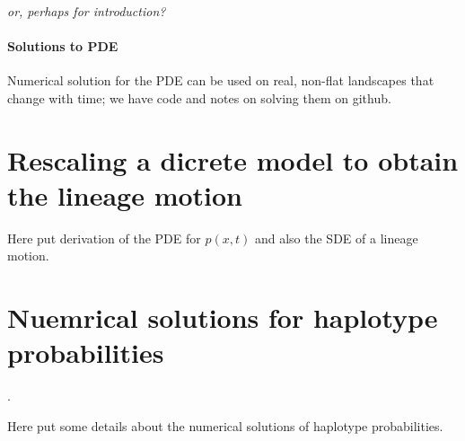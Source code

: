 \documentclass[12pt]{article}
\newcommand{\plr}[1]{{\em \color{blue} #1}}
\begin{document}
\plr{or, perhaps for introduction?}



\paragraph{Solutions to PDE}
Numerical solution for the PDE can be used on real, non-flat landscapes that change with time;
we have code and notes on solving them on github.




\appendix

\section{Rescaling a dicrete model to obtain the lineage motion}
\label{apx:lineage_derivation}

Here put derivation of the PDE for $p(x,t)$ and also the SDE of a lineage motion.

\section{Nuemrical solutions for haplotype probabilities}
\label{apx:haplotype_calcs}.

Here put some details about the numerical solutions of haplotype probabilities.
\end{document}
